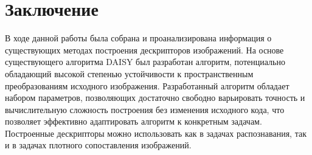 {{{\newpage
{}
{}
\section*{Заключение}
{
    В ходе данной работы была собрана и проанализирована информация о существующих методах построения дескрипторов изображений. На основе существующего алгоритма DAISY был разработан алгоритм, потенциально обладающий высокой степенью устойчивости к пространственным преобразованиям исходного изображения.
    Разработанный алгоритм обладает набором параметров, позволяющих достаточно свободно варьировать точность и вычислительную сложность построения без изменения исходного кода, что позволяет эффективно адаптировать алгоритм к конкретным задачам. 
    Построенные дескрипторы можно использовать как в задачах распознавания, так и в задачах плотного сопоставления изображений. 
}

\newpage
{}
{}
}}}
